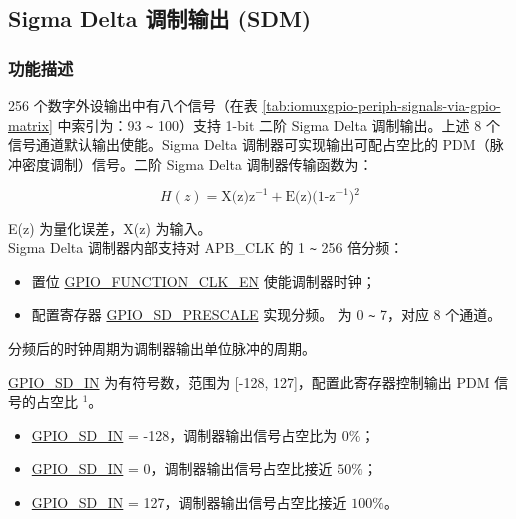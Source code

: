 \documentclass[main\_\_CN.tex]{subfiles}
\begin{document}
\subsection{Sigma Delta 调制输出 (SDM)}

\subsubsection{功能描述}
256 个数字外设输出中有八个信号（在表 \ref{tab:iomuxgpio-periph-signals-via-gpio-matrix} 中索引为：93 \verb+~+ 100）支持 1-bit 二阶 Sigma Delta 调制输出。上述 8 个信号通道默认输出使能。Sigma Delta 调制器可实现输出可配占空比的 PDM（脉冲密度调制）信号。二阶 Sigma Delta 调制器传输函数为：

\[
    H(z)=\textrm{X(z)z$^{-1}$} + \textrm{E(z)(1-z$^{-1}$)$^{2}$}
    \]

E(z) 为量化误差，X(z) 为输入。\\
Sigma Delta 调制器内部支持对 APB\_CLK 的 1 \verb+~+ 256 倍分频：

\begin{itemize}
    \item 置位 \hyperref[fielddesc:GPIOSDFUNCTIONCLKEN]{GPIO\_FUNCTION\_CLK\_EN} 使能调制器时钟；
    \item 配置寄存器 \hyperref[fielddesc:GPIOSDSDNPRESCALE]{GPIO\_SD\_PRESCALE} 实现分频。 为 0 \verb+~+ 7，对应 8 个通道。
\end{itemize}
分频后的时钟周期为调制器输出单位脉冲的周期。

\hyperref[fielddesc:GPIOSDSDNIN]{GPIO\_SD\_IN} 为有符号数，范围为 [-128, 127]，配置此寄存器控制输出 PDM 信号的占空比 $^{1}$。

\begin{itemize}
    \item \hyperref[fielddesc:GPIOSDSDNIN]{GPIO\_SD\_IN} = -128，调制器输出信号占空比为 \begin{math}0\% \end{math}；
    \item \hyperref[fielddesc:GPIOSDSDNIN]{GPIO\_SD\_IN} = 0，调制器输出信号占空比接近  \begin{math}50\% \end{math}；
    \item \hyperref[fielddesc:GPIOSDSDNIN]{GPIO\_SD\_IN} = 127，调制器输出信号占空比接近  \begin{math}100\% \end{math}。
\end{itemize}
\end{document}
